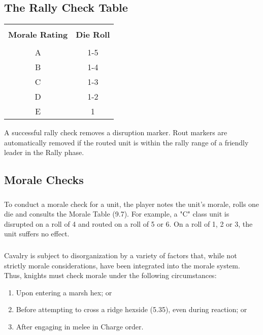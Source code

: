 \subsection{The Rally Check Table}

\begin{tabular}{ |cc| }
    \hline & \\[-2.0ex]
    \textbf{Morale Rating} & {\textbf{Die Roll}} \\
    \hline & \\ [-2.0ex]
    A & 1-5 \\
    B & 1-4 \\
    C & 1-3 \\
    D & 1-2 \\
    E & 1 \\
    \hline
\end{tabular}

A successful rally check removes a disruption marker. Rout markers are automatically removed if the routed unit is within the rally range of a friendly leader in the Rally phase.

\subsection{Morale Checks}

\subsubsection[Conducting Morale Checks]{} To conduct a morale check for a unit, the player notes the unit's morale, rolls one die and consults the Morale Table (9.7). For example, a "C" class unit is disrupted on a roll of 4 and routed on a roll of 5 or 6. On a roll of 1, 2 or 3, the unit suffers no effect.

\subsubsection[Cavalry]{} Cavalry is subject to disorganization by a variety of factors that, while not strictly morale considerations, have been integrated into the morale system. Thus, knights must check morale under the following circumstances:

\begin{enumerate}
  \item Upon entering a marsh hex; or
  \item Before attempting to cross a ridge hexside (5.35), even during reaction; or
  \item After engaging in melee in Charge order.
\end{enumerate}

